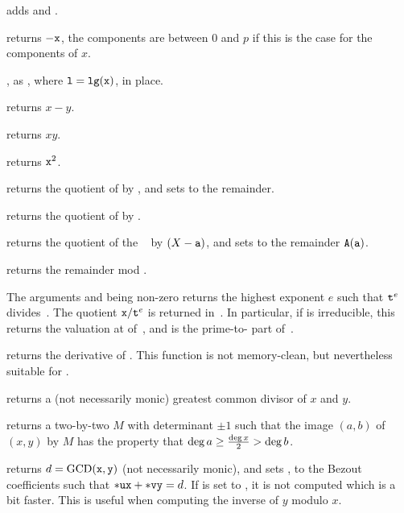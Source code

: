  adds  and .

 returns $-{\tt x}$, the components are
between $0$ and $p$ if this is the case for the components of $x$.

, as , where
${\tt l} = {\tt lg(x)}$, in place.

 returns $x - y$.

 returns $x y$.

 returns ${\tt x}^2$.

 returns the quotient
of  by , and sets  to the remainder.

 returns the quotient of  by
.

 returns the
quotient of the ~ by $(X - {\tt a})$, and sets  to the
remainder ${\tt A}({\tt a})$.

 returns the remainder  mod
.

 The arguments  and
 being non-zero  returns the highest exponent $e$ such that
${\tt t}^{e}$ divides~. The quotient ${\tt x}/{\tt t}^{e}$ is returned
in~. In particular, if  is irreducible, this returns the
valuation at  of~, and  is the prime-to- part
of~.

 returns the derivative of .
This function is not memory-clean, but nevertheless suitable for
.

 returns a (not necessarily monic)
greatest common divisor of $x$  and $y$.

 returns a two-by-two  $M$ with determinant
$\pm 1$ such that the image $(a,b)$ of $(x,y)$ by $M$ has the property that
$\deg a \geq {\deg x \over 2} > \deg b$.

 returns
$d = {\rm GCD}({\tt x},{\tt y})$ (not necessarily monic), and sets ,
 to the Bezout coefficients such that ${\tt *ux} + {\tt *vy} = d$.
If  is set to , it is not computed which is a bit faster.
This is useful when computing the inverse of $y$ modulo $x$.

